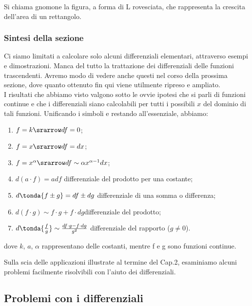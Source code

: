 \begin{osservazione}
 Si chiama gnomone la figura, a forma di L rovesciata, che rappresenta la 
crescita dell'area di un rettangolo.
\end{osservazione}


\subsubsection{Sintesi della sezione}
\label{subsubsec:diff01_diffsint}
Ci siamo limitati a calcolare solo alcuni differenziali elementari, 
attraverso esempi 
e dimostrazioni. Manca del tutto la trattazione dei differenziali delle
funzioni trascendenti. Avremo modo di vedere anche questi nel corso della 
prossima
sezione, dove quanto ottenuto fin qui viene utilmente ripreso e ampliato.\\
\newline
I risultati che abbiamo visto valgono sotto le ovvie ipotesi
che si parli di funzioni continue e che i differenziali siano calcolabili
per tutti i possibili $x$ del dominio di tali funzioni. Unificando i simboli 
e restando
all'essenziale, abbiamo:
\begin{enumerate} [noitemsep]
 \item $f=k \srarrow df=0$;
 \item $f=x \srarrow df=dx$;
 \item $f=x^\alpha \srarrow df\sim\alpha x^{\alpha-1}dx$;\newline
 \item $d(a\cdot f)=adf$ \tab differenziale del prodotto per una costante;
 \item $d\tonda{f\pm g}=df\pm dg$ \tab differenziale di una somma o 
differenza;
 \item $d(f\cdot g)\sim f\cdot g+f\cdot dg$\tab differenziale del prodotto;
 \item $d\tonda{\frac{f}{g}}\sim\frac{df\cdot g-f\cdot dg}{g^2}$\tab  
differenziale 
 del rapporto (\(g \ne 0\)).
\end{enumerate}
dove  $k$, $a$, $\alpha$ rappresentano delle costanti, mentre f e g sono 
funzioni continue. 


Sulla scia delle applicazioni illustrate al termine del Cap.2, esaminiamo 
alcuni problemi 
facilmente risolvibili con l'aiuto dei differenziali.

\subsection{Problemi con i differenziali}
\label{subsec:diff01__problemi}


